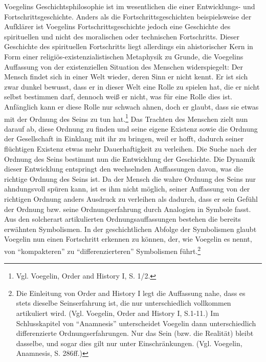 Voegelins Geschichtsphilosophie ist im wesentlichen die einer Entwicklungs-
und Fortschrittsgeschichte. Anders als die Fortschrittsgeschichten
beispielsweise der Aufklärer ist Voegelins Fortschrittsgeschichte jedoch eine
Geschichte des spirituellen und nicht des moralischen oder technischen
Fortschritts. Dieser Geschichte des spirituellen Fortschritts liegt allerdings
ein ahistorischer Kern in Form einer religiös-existenzialistischen Metaphysik
zu Grunde, die Voegelins Auf\/fassung von der existenziellen Situation des
Menschen widerspiegelt: Der Mensch findet sich in einer Welt wieder, deren
Sinn er nicht kennt. Er ist sich zwar dunkel bewusst, dass er in dieser Welt
eine Rolle zu spielen hat, die er nicht selbst bestimmen darf, dennoch weiß
er nicht, was für eine Rolle dies ist. Anfänglich kann er diese Rolle nur
schwach ahnen, doch er glaubt, dass sie etwas mit der Ordnung des Seins zu tun
hat.\footnote{Vgl. Voegelin, Order and History I, S. 1/2.} Das Trachten des
Menschen zielt nun darauf ab, diese Ordnung zu finden und seine eigene
Existenz sowie die Ordnung der Gesellschaft in Einklang mit ihr zu bringen,
weil er hofft, dadurch seiner flüchtigen Existenz etwas mehr Dauerhaftigkeit
zu verleihen. Die Suche nach der Ordnung des Seins bestimmt nun die
Entwicklung der Geschichte. Die Dynamik dieser Entwicklung entspringt den
wechselnden Auf\/fassungen davon, was die richtige Ordnung des Seins ist. Da
der Mensch die wahre Ordnung des Seins nur ahndungsvoll spüren kann, ist es
ihm nicht möglich, seiner Auf\/fassung von der richtigen Ordnung anders
Ausdruck zu verleihen als dadurch, dass er sein Gefühl der Ordnung bzw. seine
Ordnungserfahrung durch Analogien in Symbole fasst. Aus den solcherart
artikulierten Ordnungsauf\/fassungen bestehen die bereits erwähnten
Symbolismen.  In der geschichtlichen Abfolge der Symbolismen glaubt Voegelin
nun einen Fortschritt erkennen zu können, der, wie Voegelin es nennt, von
"`kompakteren"' zu "`differenzierteren"' Symbolismen
führt.\footnote{\label{FNErfahrung} Die Einleitung von Order and History I legt
  die Auf\/fassung nahe, dass es stets dieselbe Seinserfahrung ist, die nur
  unterschiedlich vollkommen artikuliert wird. (Vgl. Voegelin, Order and
  History I, S.1-11.) Im Schlusskapitel von "`Anamnesis"' unterscheidet
  Voegelin dann unterschiedlich differenzierte Ordnungserfahrungen. Nur das
  Sein (bzw. die Realität) bleibt dasselbe, und sogar dies gilt nur unter
  Einschränkungen.  (Vgl. Voegelin, Anamnesis, S. 286ff.)}

